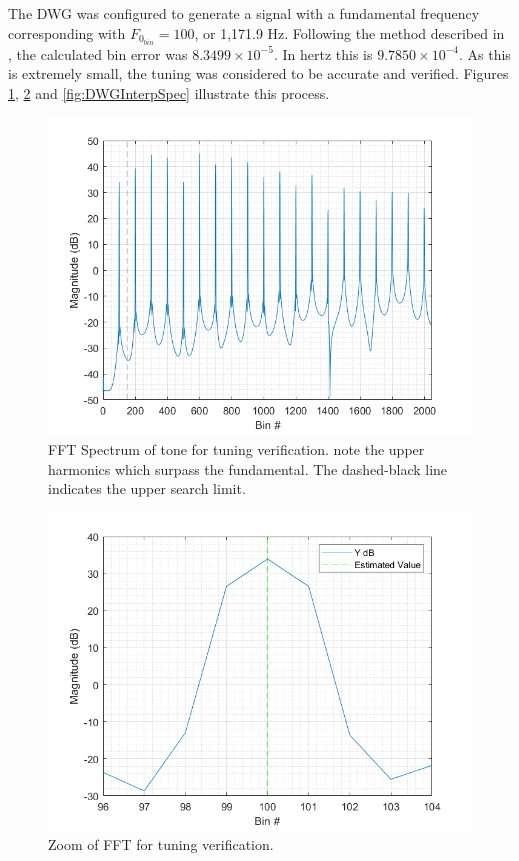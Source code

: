 \documentclass[../main.tex]{subfiles}
\begin{document}
The DWG was configured to generate a signal with a fundamental frequency corresponding with $F_{0_{bin}} = 100$, or 1,171.9 Hz. Following the method described in , the calculated bin error was $8.3499 \times 10^{-5}$. In hertz this is $9.7850 \times 10^{-4}$. As this is extremely small, the tuning was considered to be accurate and verified. Figures \ref{fig:DWGInterpBins}, \ref{fig:DWGInterpBinsZoom} and \ref{fig:DWGInterpSpec} illustrate this process.

\begin{figure}[h]
    \centering
    \includegraphics[scale=.65]{./images/plots/StringDWGInterpBins.png}
    \caption{FFT Spectrum of tone for tuning verification. note the upper harmonics which surpass the fundamental. The dashed-black line indicates the upper search limit.}
    \label{fig:DWGInterpBins}
\end{figure}

\begin{figure}[h]
    \centering
    \includegraphics[scale=.65]{./images/plots/StringDWGInterpBinsZoom.png}
    \caption{Zoom of FFT for tuning verification.}
    \label{fig:DWGInterpBinsZoom}
\end{figure}
\end{document}
